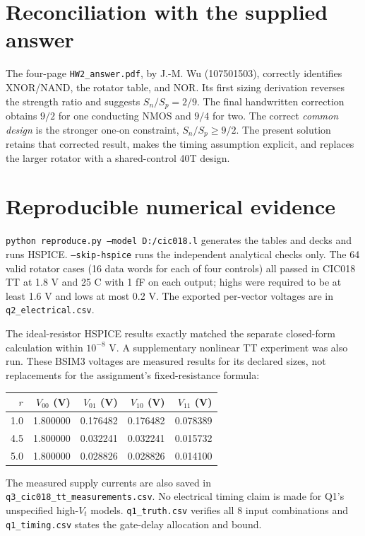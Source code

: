 \documentclass[11pt]{article}
\begin{document}
\section*{Reconciliation with the supplied answer}
The four-page \texttt{HW2\_answer.pdf}, by J.-M. Wu (107501503), correctly identifies XNOR/NAND, the rotator table, and NOR. Its first sizing derivation reverses the strength ratio and suggests $S_n/S_p=2/9$. The final handwritten correction obtains $9/2$ for one conducting NMOS and $9/4$ for two. The correct \emph{common design} is the stronger one-on constraint, $S_n/S_p\ge9/2$. The present solution retains that corrected result, makes the timing assumption explicit, and replaces the larger rotator with a shared-control 40T design.
\newpage\section*{Reproducible numerical evidence}
\texttt{python reproduce.py --model D:/cic018.l} generates the tables and decks and runs HSPICE. \texttt{--skip-hspice} runs the independent analytical checks only. The 64 valid rotator cases (16 data words for each of four controls) all passed in CIC018 TT at 1.8 V and 25 C with 1 fF on each output; highs were required to be at least 1.6 V and lows at most 0.2 V. The exported per-vector voltages are in \texttt{q2\_electrical.csv}.

The ideal-resistor HSPICE results exactly matched the separate closed-form calculation within $10^{-8}$ V. A supplementary nonlinear TT experiment was also run. These BSIM3 voltages are measured results for its declared sizes, not replacements for the assignment's fixed-resistance formula:
\begin{center}\begin{tabular}{r|rrrr}\toprule
$r$&$V_{00}$ (V)&$V_{01}$ (V)&$V_{10}$ (V)&$V_{11}$ (V)\\\midrule
1.0&1.800000&0.176482&0.176482&0.078389\\
4.5&1.800000&0.032241&0.032241&0.015732\\
5.0&1.800000&0.028826&0.028826&0.014100\\
\bottomrule\end{tabular}\end{center}
The measured supply currents are also saved in \texttt{q3\_cic018\_tt\_measurements.csv}. No electrical timing claim is made for Q1's unspecified high-$V_t$ models. \texttt{q1\_truth.csv} verifies all 8 input combinations and \texttt{q1\_timing.csv} states the gate-delay allocation and bound.
\end{document}
